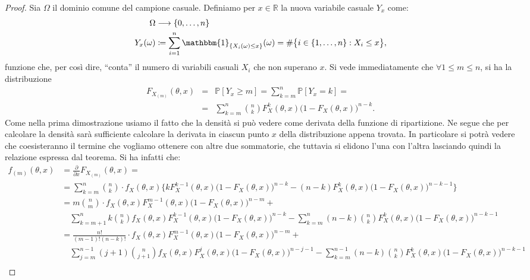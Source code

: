 \begin{proof}
Sia $\Omega$ il dominio comune del campione casuale. Definiamo per $x\in \mathbb{R}$ la nuova variabile casuale $Y_x$ come:
\begin{align*}
\Omega &\longrightarrow  \{0,\ldots,n\} \\
Y_x(\omega)  &\coloneqq   \sum_{i=1}^n \mathbbm{1}_{\{X_i(\omega)\leq x\}}(\omega)=\#\big\{i\in\{1,\ldots,n\}: X_i\leq x\big\},
\end{align*}
funzione che, per così dire, ``conta'' il numero di variabili casuali $X_i$ che non superano $x$. Si vede immediatamente che $\forall 1\leq m\leq n$, si ha la distribuzione 
\begin{eqnarray*}
F_{X_{(m)}}(\theta,x) &=& \mathbb{P}[Y_x\geq m]=\sum_{k=m}^n \mathbb{P}[Y_x=k]= \\
&=& \sum_{k=m}^n \binom{n}{k}F_X^k(\theta,x)\big(1-F_X(\theta,x)\big)^{n-k}.
\end{eqnarray*}
Come nella prima dimostrazione usiamo il fatto che la densità si può vedere come derivata della funzione di ripartizione. Ne segue che per calcolare la densità sarà sufficiente calcolare la derivata in ciascun punto $x$ della distribuzione appena trovata. In particolare si potrà vedere che coesisteranno il termine che vogliamo ottenere con altre due sommatorie, che tuttavia si elidono l'una con l'altra lasciando quindi la relazione espressa dal teorema. Si ha infatti che: 
\\
\footnotesize{
\begin{equation*}\label{e:barwq}\begin{split}
f_{(m)}(\theta,x)&=\frac{\partial}{\partial x}F_{X_{(m)}}(\theta,x)= \\
&=\sum_{k=m}^n \binom{n}{k}\cdot f_{X}(\theta,x) \bigg\{k F_X^{k-1}(\theta,x) \big(1-F_X(\theta,x)\big)^{n-k}-(n-k) F_X^{k}(\theta,x)\big(1-F_X(\theta,x)\big)^{n-k-1}\bigg\} \\
&=m\binom{n}{m}\cdot f_{X}(\theta,x)F_X^{m-1}(\theta,x) \big(1-F_X(\theta,x)\big)^{n-m} + \\ &\quad \sum_{k=m+1}^n k\binom{n}{k} f_{X}(\theta,x) F_X^{k-1}(\theta,x) \big(1-F_X(\theta,x)\big)^{n-k}-\sum_{k=m}^n (n-k)\binom{n}{k} F_X^{k}(\theta,x)\big(1-F_X(\theta,x)\big)^{n-k-1} \\
&=\frac{n!}{(m-1)!(n-k)!}\cdot f_{X}(\theta,x)F_X^{m-1}(\theta,x) \big(1-F_X(\theta,x)\big)^{n-m} + \\
&\quad \sum_{j=m}^{n-1} (j+1)\binom{n}{j+1} f_{X}(\theta,x) F_X^{j}(\theta,x) \big(1-F_X(\theta,x)\big)^{n-j-1}-\sum_{k=m}^{n-1} (n-k)\binom{n}{k} F_X^{k}(\theta,x)\big(1-F_X(\theta,x)\big)^{n-k-1} \\

\end{split}
\end{equation*}}
\end{proof}
